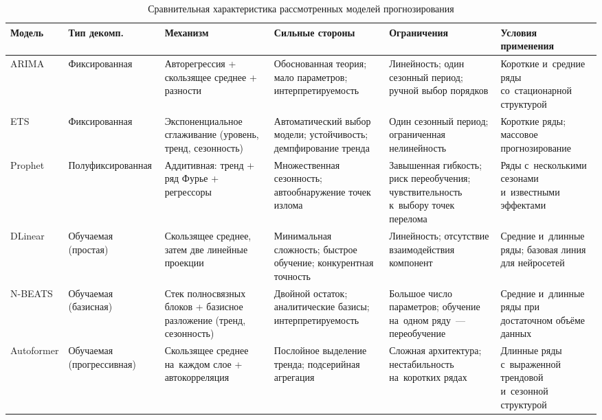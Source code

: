 \begin{table}[H]
\centering
\caption{Сравнительная характеристика рассмотренных моделей прогнозирования}
\label{tab:model-comparison}
\scriptsize
\renewcommand{\arraystretch}{1.2}
\begin{tabular}{|p{1.4cm}|p{1.5cm}|p{2.6cm}|p{2.6cm}|p{2.6cm}|p{2.6cm}|}
\hline
\textbf{Модель} &
\textbf{Тип декомп.} &
\textbf{Механизм} &
\textbf{Сильные стороны} &
\textbf{Ограничения} &
\textbf{Условия применения} \\
\hline

ARIMA &
Фиксиро\-ванная &
Авторегрессия + скользящее среднее + разности &
Обоснованная теория; мало параметров; интерпретируемость &
Линейность; один сезонный период; ручной выбор порядков &
Короткие и~средние ряды со~стационарной структурой \\
\hline

ETS &
Фиксиро\-ванная &
Экспоненциальное сглаживание (уровень, тренд, сезонность) &
Автоматический выбор модели; устойчивость; демпфирование тренда &
Один сезонный период; ограниченная нелинейность &
Короткие ряды; массовое прогнозирование \\
\hline

Prophet &
Полу\-фиксиро\-ванная &
Аддитивная: тренд + ряд Фурье + регрессоры &
Множественная сезонность; автообнаружение точек излома &
Завышенная гибкость; риск переобучения; чувствительность к~выбору точек перелома &
Ряды с~несколькими сезонами и~известными эффектами \\
\hline

DLinear &
Обучаемая (простая) &
Скользящее среднее, затем две линейные проекции &
Минимальная сложность; быстрое обучение; конкурентная точность &
Линейность; отсутствие взаимодействия компонент &
Средние и~длинные ряды; базовая линия для нейросетей \\
\hline

N-BEATS &
Обучаемая (базисная) &
Стек полносвязных блоков + базисное разложение (тренд, сезонность) &
Двойной остаток; аналитические базисы; интерпретируемость &
Большое число параметров; обучение на~одном ряду~--- переобучение &
Средние и~длинные ряды при достаточном объёме данных \\
\hline

Autoformer &
Обучаемая (прогрессив\-ная) &
Скользящее среднее на~каждом слое + автокорреляция &
Послойное выделение тренда; подсерийная агрегация &
Сложная архитектура; нестабильность на~коротких рядах &
Длинные ряды с~выраженной трендовой и~сезонной структурой \\
\hline


\end{tabular}
\end{table}
